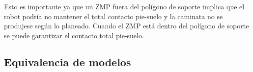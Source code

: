 Esto es importante ya que un ZMP fuera del polígono de soporte implica que el robot podría no mantener el total contacto pie-suelo y la caminata no se produjese según lo planeado. Cuando el ZMP está dentro del polígono de soporte se puede garantizar el contacto total pie-suelo.

\newpage

\subsection{Equivalencia de modelos}\label{equivalencia_modelos}


